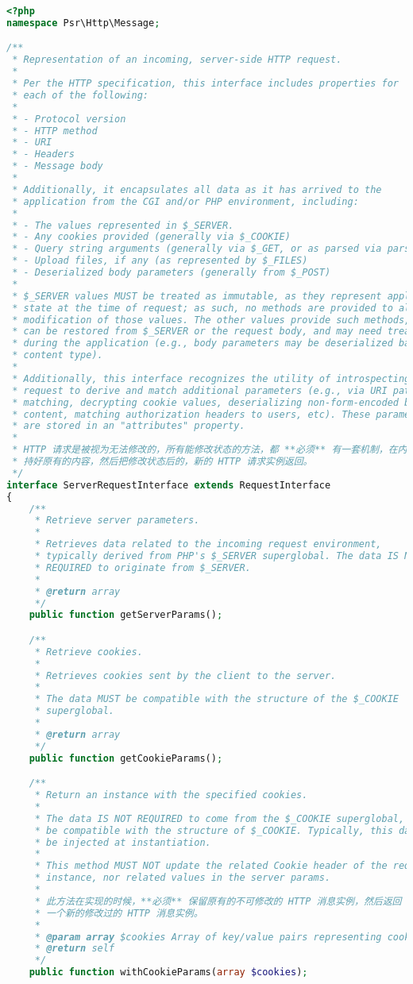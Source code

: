 \begin{lstlisting}[language=PHP]
<?php
namespace Psr\Http\Message;

/**
 * Representation of an incoming, server-side HTTP request.
 *
 * Per the HTTP specification, this interface includes properties for
 * each of the following:
 *
 * - Protocol version
 * - HTTP method
 * - URI
 * - Headers
 * - Message body
 *
 * Additionally, it encapsulates all data as it has arrived to the
 * application from the CGI and/or PHP environment, including:
 *
 * - The values represented in $_SERVER.
 * - Any cookies provided (generally via $_COOKIE)
 * - Query string arguments (generally via $_GET, or as parsed via parse_str())
 * - Upload files, if any (as represented by $_FILES)
 * - Deserialized body parameters (generally from $_POST)
 *
 * $_SERVER values MUST be treated as immutable, as they represent application
 * state at the time of request; as such, no methods are provided to allow
 * modification of those values. The other values provide such methods, as they
 * can be restored from $_SERVER or the request body, and may need treatment
 * during the application (e.g., body parameters may be deserialized based on
 * content type).
 *
 * Additionally, this interface recognizes the utility of introspecting a
 * request to derive and match additional parameters (e.g., via URI path
 * matching, decrypting cookie values, deserializing non-form-encoded body
 * content, matching authorization headers to users, etc). These parameters
 * are stored in an "attributes" property.
 *
 * HTTP 请求是被视为无法修改的，所有能修改状态的方法，都 **必须** 有一套机制，在内部保
 * 持好原有的内容，然后把修改状态后的，新的 HTTP 请求实例返回。
 */
interface ServerRequestInterface extends RequestInterface
{
    /**
     * Retrieve server parameters.
     *
     * Retrieves data related to the incoming request environment,
     * typically derived from PHP's $_SERVER superglobal. The data IS NOT
     * REQUIRED to originate from $_SERVER.
     *
     * @return array
     */
    public function getServerParams();

    /**
     * Retrieve cookies.
     *
     * Retrieves cookies sent by the client to the server.
     *
     * The data MUST be compatible with the structure of the $_COOKIE
     * superglobal.
     *
     * @return array
     */
    public function getCookieParams();

    /**
     * Return an instance with the specified cookies.
     *
     * The data IS NOT REQUIRED to come from the $_COOKIE superglobal, but MUST
     * be compatible with the structure of $_COOKIE. Typically, this data will
     * be injected at instantiation.
     *
     * This method MUST NOT update the related Cookie header of the request
     * instance, nor related values in the server params.
     *
     * 此方法在实现的时候，**必须** 保留原有的不可修改的 HTTP 消息实例，然后返回
     * 一个新的修改过的 HTTP 消息实例。
     * 
     * @param array $cookies Array of key/value pairs representing cookies.
     * @return self
     */
    public function withCookieParams(array $cookies);


\end{lstlisting}
